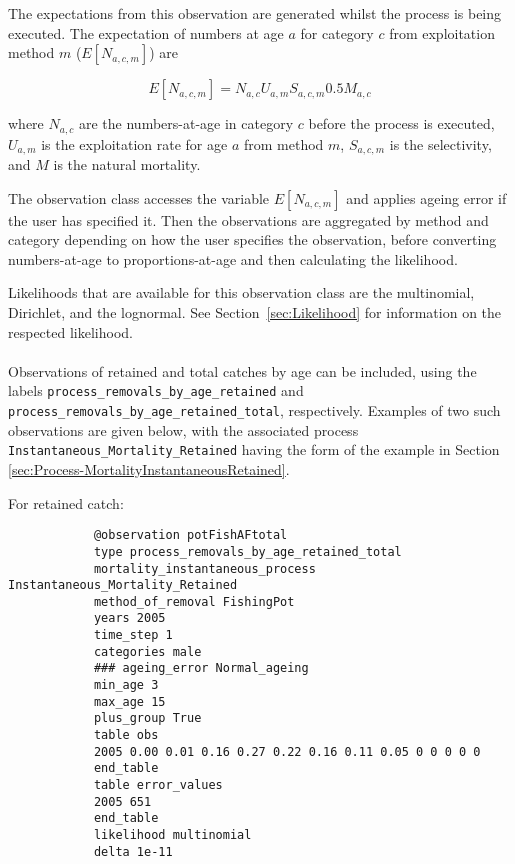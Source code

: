 \begin{itemize}
	The expectations from this observation are generated whilst the process is being executed. The expectation of numbers at age $a$ for category $c$ from exploitation method $m$ ($E[N_{a,c,m}]$) are
	
	\begin{equation}
	E[N_{a,c,m}] = N_{a,c} U_{a,m} S_{a,c,m} 0.5 M_{a,c}
	\end{equation}
	
	where $N_{a,c}$ are the numbers-at-age in category $c$ before the process is executed, $U_{a,m}$ is the exploitation rate for age $a$ from method $m$, $S_{a,c,m}$ is the selectivity, and $M$ is the natural mortality.
	
	The observation class accesses the variable $E[N_{a,c,m}]$ and applies ageing error if the user has specified it. Then the observations are aggregated by method and category depending on how the user specifies the observation, before converting numbers-at-age to proportions-at-age and then calculating the likelihood.
	
	Likelihoods that are available for this observation class are the multinomial, Dirichlet, and the lognormal. See Section~\ref{sec:Likelihood} for information on the respected likelihood.
	
	\paragraph*{} \label{sec:Observation-ProcessRemovalsByAgeRetained} \label{sec:Observation-ProcessRemovalsByAgeRetainedTotal}
	
	Observations of retained and total catches by age can be included, using the labels \texttt{process\_removals\_by\_age\_retained} and \texttt{process\_removals\_by\_age\_retained\_total}, respectively. Examples of two such observations are given below, with the associated process \texttt{Instantaneous\_Mortality\_Retained} having the form of the example in Section \ref{sec:Process-MortalityInstantaneousRetained}.
	
	For retained catch:
	
	{\small{\begin{verbatim}
			@observation potFishAFtotal
			type process_removals_by_age_retained_total
			mortality_instantaneous_process Instantaneous_Mortality_Retained
			method_of_removal FishingPot
			years 2005
			time_step 1
			categories male
			### ageing_error Normal_ageing
			min_age 3
			max_age 15
			plus_group True
			table obs
			2005 0.00 0.01 0.16 0.27 0.22 0.16 0.11 0.05 0 0 0 0 0
			end_table
			table error_values
			2005 651
			end_table
			likelihood multinomial
			delta 1e-11
			\end{verbatim}}}
	

\end{itemize}
